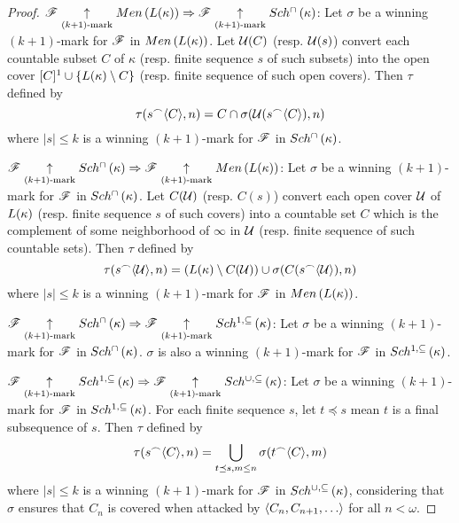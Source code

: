 \documentclass{amsart}
\theoremstyle{definition}
\begin{document}
\begin{proof}
  \(\mathscr{F} \underset{(k+1)\text{-mark}}{\uparrow}Men\left({L(\kappa)}\right)
    \Rightarrow
  \mathscr{F} \underset{(k+1)\text{-mark}}{\uparrow}Sch^{\cap}\left({\kappa}\right)\):
  Let \(\sigma\) be a winning \((k+1)\)-mark for \(\mathscr{F}\) in
  \(Men\left({L(\kappa)}\right)\). Let \(\mathcal{U}(C)\) (resp. \(\mathcal{U}(s)\)) convert each
  countable subset \(C\) of \(\kappa\) (resp. finite sequence \(s\) of such subsets)
  into the open cover \([C]^1\cup\{L(\kappa)\setminus C\}\)
  (resp. finite sequence of such open covers). Then \(\tau\) defined by
    \[
      \tau(s{^\frown}\langle C\rangle,n)
        =
      C\cap\sigma(\mathcal{U}(s{^\frown}\langle C\rangle),n)
    \]
  where \(|s|\leq k\)
  is a winning \((k+1)\)-mark for \(\mathscr{F}\) in \(Sch^{\cap}\left({\kappa}\right)\).

  \(\mathscr{F} \underset{(k+1)\text{-mark}}{\uparrow}Sch^{\cap}\left({\kappa}\right)
    \Rightarrow
  \mathscr{F} \underset{(k+1)\text{-mark}}{\uparrow}Men\left({L(\kappa)}\right)\):
  Let \(\sigma\) be a winning \((k+1)\)-mark for \(\mathscr{F}\) in
  \(Sch^{\cap}\left({\kappa}\right)\). Let \(C(\mathcal{U})\) (resp. \(C(s)\)) convert each open
  cover \(\mathcal{U}\) of \(L(\kappa)\) (resp. finite sequence \(s\) of such covers)
  into a countable set \(C\) which is the complement of some neighborhood of
  \(\infty\) in \(\mathcal{U}\) (resp. finite sequence of such countable sets).
  Then \(\tau\) defined by
    \[
      \tau(s{^\frown}\langle\mathcal{U}\rangle,n)
        =
      (L(\kappa)\setminus C(\mathcal{U}))
        \cup
      \sigma(C(s{^\frown}\langle\mathcal{U}\rangle),n)
    \]
  where \(|s|\leq k\)
  is a winning \((k+1)\)-mark for \(\mathscr{F}\) in \(Men\left({L(\kappa)}\right)\).

  \(\mathscr{F} \underset{(k+1)\text{-mark}}{\uparrow}Sch^{\cap}\left({\kappa}\right)
    \Rightarrow
  \mathscr{F} \underset{(k+1)\text{-mark}}{\uparrow}Sch^{1,\subseteq}\left({\kappa}\right)\):
  Let \(\sigma\) be a winning \((k+1)\)-mark for \(\mathscr{F}\) in
  \(Sch^{\cap}\left({\kappa}\right)\). \(\sigma\) is also a winning \((k+1)\)-mark for \(\mathscr{F}\)
  in \(Sch^{1,\subseteq}\left({\kappa}\right)\).

  \(\mathscr{F} \underset{(k+1)\text{-mark}}{\uparrow}Sch^{1,\subseteq}\left({\kappa}\right)
    \Rightarrow
  \mathscr{F} \underset{(k+1)\text{-mark}}{\uparrow}Sch^{\cup,\subseteq}\left({\kappa}\right)\): Let \(\sigma\) be a winning
  \((k+1)\)-mark for \(\mathscr{F}\) in
  \(Sch^{1,\subseteq}\left({\kappa}\right)\). For each finite sequence \(s\), let
  \(t\preceq s\) mean \(t\)
  is a final subsequence of \(s\). Then \(\tau\) defined by
    \[
      \tau(s{^\frown}\langle C\rangle,n)
        =
      \bigcup_{t\preceq s, m\leq n}
      \sigma(t{^\frown}\langle C\rangle,m)
    \]
  where \(|s|\leq k\)
  is a winning \((k+1)\)-mark for \(\mathscr{F}\) in \(Sch^{\cup,\subseteq}\left({\kappa}\right)\),
  considering that \(\sigma\) ensures that \(C_n\) is covered when
  attacked by \(\<C_n,C_{n+1},\dots\>\) for all \(n<\omega\).


\end{proof}
\end{document}
